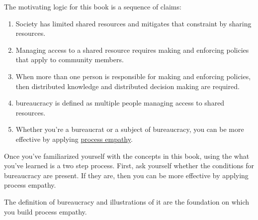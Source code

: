 The motivating logic for this book is a sequence of claims:
\begin{enumerate}
    \item Society has limited \glspl{shared resource} and mitigates that constraint by sharing resources.
    \item Managing access to a shared resource requires making and enforcing policies that apply to community members. 
    \item When more than one person is responsible for making and enforcing policies, then distributed knowledge and distributed decision making are required. 
    \item \Gls{bureaucracy} is defined as multiple people managing access to \glspl{shared resource}. 
    \item Whether you're a \gls{bureaucrat} or a subject of bureaucracy, you can be more effective by applying \hyperref[sec:process-empathy]{process empathy}.
\end{enumerate}

Once you've familiarized yourself with the concepts in this book, using the what you've learned is a two step process. First, ask yourself whether the conditions for bureaucracy are present. If they are, then you can be more effective by applying process empathy.

The definition of bureaucracy and illustrations of it are the foundation on which you build process empathy. 